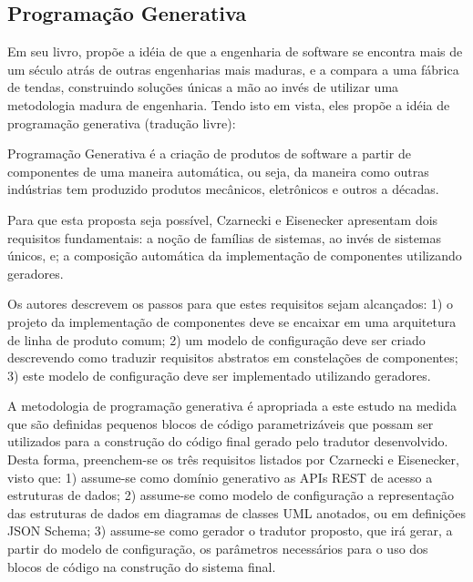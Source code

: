 \subsection{Programação Generativa}

Em seu livro,  propõe a idéia de que a engenharia de software se encontra mais de um século atrás de outras engenharias mais maduras, e a compara a uma fábrica de tendas, construindo soluções únicas a mão ao invés de utilizar uma metodologia madura de engenharia. Tendo isto em vista, eles propõe a idéia de programação generativa (tradução livre):

\begin{citacao}
Programação Generativa é a criação de produtos de software a partir de componentes de uma maneira automática, ou seja, da maneira como outras indústrias tem produzido produtos mecânicos, eletrônicos e outros a décadas.
\end{citacao}

Para que esta proposta seja possível, Czarnecki e Eisenecker apresentam dois requisitos fundamentais: a noção de famílias de sistemas, ao invés de sistemas únicos, e; a composição automática da implementação de componentes utilizando geradores.

Os autores descrevem os passos para que estes requisitos sejam alcançados: 1) o projeto da implementação de componentes deve se encaixar em uma arquitetura de linha de produto comum; 2) um modelo de configuração deve ser criado descrevendo como traduzir requisitos abstratos em constelações de componentes; 3) este modelo de configuração deve ser implementado utilizando geradores.

A metodologia de programação generativa é apropriada a este estudo na medida que são definidas pequenos blocos de código parametrizáveis que possam ser utilizados para a construção do código final gerado pelo tradutor desenvolvido. Desta forma, preenchem-se os três requisitos listados por Czarnecki e Eisenecker, visto que: 1) assume-se como domínio generativo as APIs REST de acesso a estruturas de dados; 2) assume-se como modelo de configuração a representação das estruturas de dados em diagramas de classes UML anotados, ou em definições JSON Schema; 3) assume-se como gerador o tradutor proposto, que irá gerar, a partir do modelo de configuração, os parâmetros necessários para o uso dos blocos de código na construção do sistema final.



